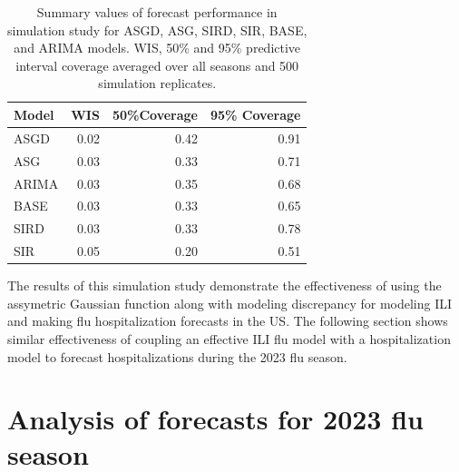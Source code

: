 \begin{table}[ht]
\centering
\caption{Summary values of forecast performance in simulation study for 
    ASGD, ASG,
    SIRD, SIR, BASE, and ARIMA models. WIS, 50\% and 95\% predictive interval
    coverage averaged over all seasons and 500 simulation replicates.}
\begin{tabular}{lrrr}
Model & WIS & 50\%Coverage  & 95\% Coverage \\ 
  \hline
ASGD & 0.02 & 0.42 & 0.91 \\ 
  ASG & 0.03 & 0.33 & 0.71 \\ 
  ARIMA & 0.03 & 0.35 & 0.68 \\ 
  BASE & 0.03 & 0.33 & 0.65 \\ 
  SIRD & 0.03 & 0.33 & 0.78 \\ 
  SIR & 0.05 & 0.20 & 0.51 \\
\end{tabular}
\label{tab:sim_wis_res}
\end{table}

The results of this simulation study demonstrate the effectiveness of using the
assymetric Gaussian function along with modeling discrepancy for modeling
ILI and making flu hospitalization
forecasts in the US. The following section shows similar effectiveness of
coupling an effective ILI flu model with a hospitalization model to forecast
hospitalizations during the 2023 flu season.





























\section{Analysis of forecasts for 2023 flu season}
\label{sec:analysis}

